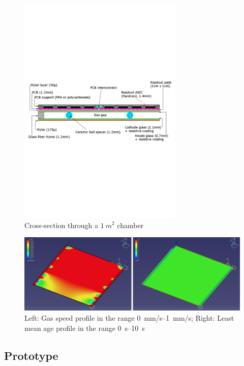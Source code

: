 \begin{figure}
\centering
\includegraphics[width=0.70\textwidth]{Calorimeter/SDHCAL_GRPC/figures/chamber}
\caption{Cross-section through a $\SI{1}{m^2}$ chamber}
\label{fig:Calorimeter:SDHCAL_GRPC:chamber}
\end{figure}


\begin{figure}
\centering
\includegraphics[width=.9\textwidth]{Calorimeter/SDHCAL_GRPC/figures/gas.png}
\caption{Left: Gas speed profile in the range \SIrange{0}{1}{mm/s}; Right: Least mean age profile in the range \SIrange{0}{10}{s}}
\label{fig:Calorimeter:SDHCAL_GRPC:gas_distribution}
\end{figure}

\subsection{Prototype}

